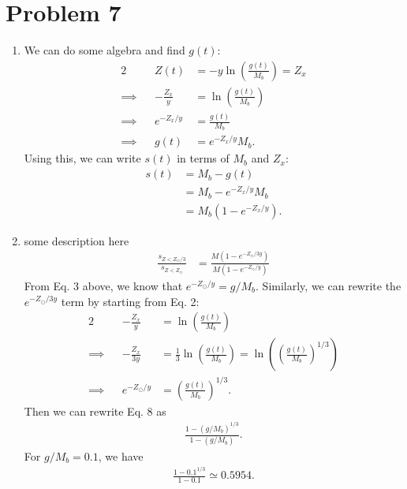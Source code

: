 \documentclass[11pt,letterpaper]{article}
\begin{document}
\section*{Problem 7}

\begin{enumerate}[label=(\roman*)]
    \item We can do some algebra and find $g(t)$:
        \begin{alignat}{2}
            &&Z(t) &= -y\ln{\left(\frac{g(t)}{M_b}\right)} = Z_x\\
            \implies&&-\frac{Z_x}{y} &= \ln{\left(\frac{g(t)}{M_b}\right)} \\
            \implies&&e^{-Z_x/y} &= \frac{g(t)}{M_b} \\
            \implies&&g(t) &= e^{-Z_x/y}M_b.
        \end{alignat}
    Using this, we can write $s(t)$ in terms of $M_b$ and $Z_x$:
    \begin{align}
        s(t) &= M_b - g(t) \\
        &= M_b - e^{-Z_x/y}M_b \\
        &= M_b(1-e^{-Z_x/y}).
    \end{align}
    
    \item some description here
    \begin{align}
        \frac{s_{Z<Z_\odot/3}}{s_{Z<Z_\odot}} &= \frac{M(1-e^{-Z_\odot/3y})}{M(1-e^{-Z_\odot/y})}
    \end{align}
    From Eq. 3 above, we know that $e^{-Z_\odot/y} = g/M_b$. Similarly, we can rewrite the $e^{-Z_\odot/3y}$ term by starting from Eq. 2:
    \begin{alignat}{2}
        &&-\frac{Z_x}{y} &= \ln{\left(\frac{g(t)}{M_b}\right)} \\
        \implies&&-\frac{Z_x}{3y} &= \frac{1}{3}\ln{\left(\frac{g(t)}{M_b}\right)} = \ln{\left(\left(\frac{g(t)}{M_b}\right)^{1/3}\right)} \\
        \implies&&e^{-Z_\odot/y} &= \left(\frac{g(t)}{M_b}\right)^{1/3}.
    \end{alignat}
    Then we can rewrite Eq. 8 as 
    \begin{align}
        \frac{1-(g/M_b)^{1/3}}{1-(g/M_b)}.
    \end{align}
    For $g/M_b = 0.1$, we have 
    \begin{align}
        \frac{1-0.1^{1/3}}{1-0.1} \simeq 0.5954.
    \end{align}
\end{enumerate}
\end{document}
